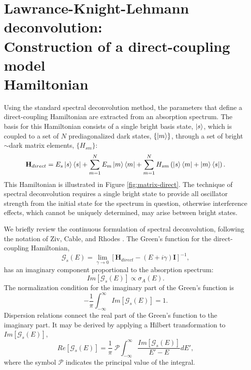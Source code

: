 \section{Lawrance-Knight-Lehmann deconvolution: \\
  Construction of a direct-coupling model \\Hamiltonian}

Using the standard spectral deconvolution method, the parameters that
define a direct-coupling Hamiltonian are extracted from an absorption
spectrum.  The basis for this Hamiltonian consists of a single bright
basis state, $\mathinner{|{s}\rangle}$, which is coupled to a set of $N$
prediagonalized dark states, $\lbrace \mathinner{|{m}\rangle} \rbrace$, through a set
of bright$\sim$dark matrix elements, $\lbrace H_{sm} \rbrace$:
\begin{equation}
  \mathbf{H}_{direct} = 
  E_s\mathinner{|{s}\rangle}\mathinner{\langle{s}|} 
  + \sum_{m=1}^N E_m\mathinner{|{m}\rangle}\mathinner{\langle{m}|}
  + \sum_{m=1}^N H_{sm} \left (
    \mathinner{|{s}\rangle}\mathinner{\langle{m}|} + \mathinner{|{m}\rangle}\mathinner{\langle{s}|}
  \right ).
\end{equation}
This Hamiltonian is illustrated in Figure \ref{fig:matrix-direct}.
The technique of spectral deconvolution requires a single bright state
to provide all oscillator strength from the initial state for the
spectrum in question, otherwise interference effects, which cannot be
uniquely determined, may arise between bright states.

We briefly review the continuous formulation of spectral
deconvolution, following the notation of Ziv, Cable, and Rhodes
\cite{ziv76, cable80}.  The Green's function for the direct-coupling
Hamiltonian,
\begin{equation}
  \label{eq:greens-function}
  \mathcal{G}_s(E) = 
  \underset{\gamma \rightarrow 0}{\lim}
  [\mathbf{H}_{direct} - (E + i \gamma)\mathbf{I}]^{-1},
\end{equation}
has an imaginary component proportional to the absorption spectrum:
\begin{equation}
  Im[\mathcal{G}_s(E)] \propto \sigma_A (E).
\end{equation}
The normalization condition for the imaginary part of the Green's
function is
\begin{equation}
  - \frac{1}{\pi} \int_{-\infty}^{\infty} Im[\mathcal{G}_s(E)] = 1.
\end{equation}
Dispersion relations connect the real part of the Green's function to
the imaginary part.  It may be derived by applying a Hilbert
transformation to $Im[\mathcal{G}_s(E)]$,
\begin{equation}
  \label{eq:hilbert}
  Re[\mathcal{G}_s(E)] = \frac{1}{\pi} \; 
  \mathcal{P} \int_{-\infty}^{\infty} 
  \frac{Im[\mathcal{G}_s(E)]}{E' - E} dE',
\end{equation}
where the symbol $\mathcal{P}$ indicates the principal value of the
integral.  

